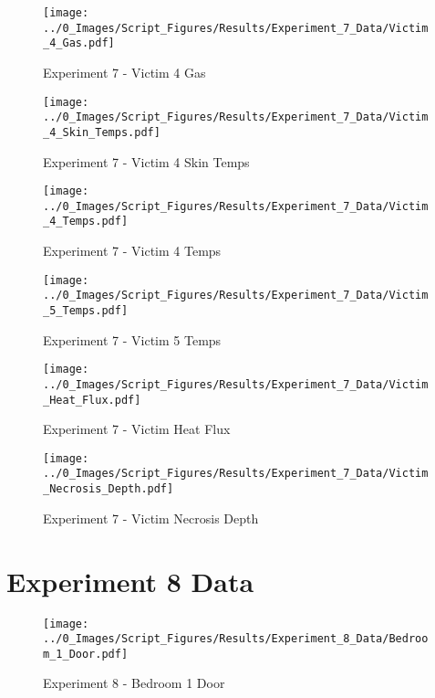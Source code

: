	\clearpage

	\begin{figure}[H]
		\centering
		\texttt{[image: ../0\_Images/Script\_Figures/Results/Experiment\_7\_Data/Victim\_4\_Gas.pdf]}
		\caption[]{Experiment 7 - Victim 4 Gas}
	\end{figure}
 

	\begin{figure}[H]
		\centering
		\texttt{[image: ../0\_Images/Script\_Figures/Results/Experiment\_7\_Data/Victim\_4\_Skin\_Temps.pdf]}
		\caption[]{Experiment 7 - Victim 4 Skin Temps}
	\end{figure}
 
	\clearpage

	\begin{figure}[H]
		\centering
		\texttt{[image: ../0\_Images/Script\_Figures/Results/Experiment\_7\_Data/Victim\_4\_Temps.pdf]}
		\caption[]{Experiment 7 - Victim 4 Temps}
	\end{figure}
 

	\begin{figure}[H]
		\centering
		\texttt{[image: ../0\_Images/Script\_Figures/Results/Experiment\_7\_Data/Victim\_5\_Temps.pdf]}
		\caption[]{Experiment 7 - Victim 5 Temps}
	\end{figure}
 
	\clearpage

	\begin{figure}[H]
		\centering
		\texttt{[image: ../0\_Images/Script\_Figures/Results/Experiment\_7\_Data/Victim\_Heat\_Flux.pdf]}
		\caption[]{Experiment 7 - Victim Heat Flux}
	\end{figure}
 

	\begin{figure}[H]
		\centering
		\texttt{[image: ../0\_Images/Script\_Figures/Results/Experiment\_7\_Data/Victim\_Necrosis\_Depth.pdf]}
		\caption[]{Experiment 7 - Victim Necrosis Depth}
	\end{figure}
 
	\clearpage

\clearpage		\large
\section{Experiment 8 Data} \label{App:Exp8Results} 

	\begin{figure}[H]
		\centering
		\texttt{[image: ../0\_Images/Script\_Figures/Results/Experiment\_8\_Data/Bedroom\_1\_Door.pdf]}
		\caption[]{Experiment 8 - Bedroom 1 Door}
	\end{figure}
 

